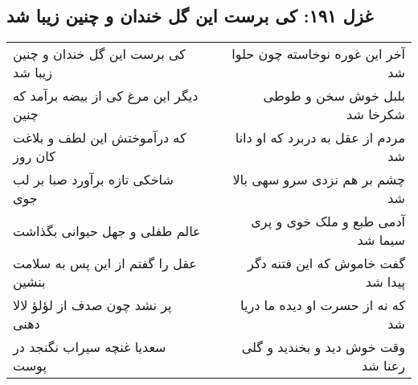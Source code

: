 \begin{center}
\section*{غزل ۱۹۱: کی برست این گل خندان و چنین زیبا شد}
\label{sec:191}
\begin{longtable}{l p{0.5cm} r}
کی برست این گل خندان و چنین زیبا شد
&&
آخر این غوره نوخاسته چون حلوا شد
\\
دیگر این مرغ کی از بیضه برآمد که چنین
&&
بلبل خوش سخن و طوطی شکرخا شد
\\
که درآموختش این لطف و بلاغت کان روز
&&
مردم از عقل به دربرد که او دانا شد
\\
شاخکی تازه برآورد صبا بر لب جوی
&&
چشم بر هم نزدی سرو سهی بالا شد
\\
عالم طفلی و جهل حیوانی بگذاشت
&&
آدمی طبع و ملک خوی و پری سیما شد
\\
عقل را گفتم از این پس به سلامت بنشین
&&
گفت خاموش که این فتنه دگر پیدا شد
\\
پر نشد چون صدف از لؤلؤ لالا دهنی
&&
که نه از حسرت او دیده ما دریا شد
\\
سعدیا غنچه سیراب نگنجد در پوست
&&
وقت خوش دید و بخندید و گلی رعنا شد
\\
\end{longtable}
\end{center}
